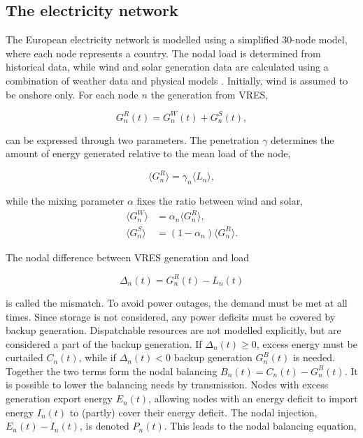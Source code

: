 \documentclass[a4paper, 5p, sort&compress]{elsarticle}%
\newcommand{\mean}[1]{\langle #1 \rangle}
\newcommand{\paren}[1]{\left(#1\right)}
\begin{document}
\subsection{The electricity network}

The European electricity network is modelled using a simplified
30-node model, where each node represents a country. The nodal load is
determined from historical data, while wind and solar generation data
are calculated using a combination of weather data and physical models
\cite{REA}. Initially, wind is assumed to be onshore only. For each
node $n$ the generation from VRES,

\begin{equation}
  G^{R}_{n}(t) = G_{n}^{W}(t) + G_{n}^{S}(t),
\end{equation}

can be expressed through two parameters. The penetration $\gamma$
determines the amount of energy generated relative to the mean load of
the node,

\begin{equation}
  \mean{G^{R}_{n}} = \gamma_{n} \mean{L_{n}} ,
\end{equation}

while the mixing parameter $\alpha$ fixes the ratio between wind and solar,
\begin{align}
  \mean{G^{W}_{n}} &=  \alpha_{n} \mean{G_{n}^{R}}  , \\
  \mean{G^{S}_{n}} &=  \paren{1- \alpha_{n}} \mean{G_{n}^{R}}  .
\end{align}

The nodal difference between VRES generation and load

\begin{equation}
  \Delta_{n}(t) = G^{R}_{n}(t) - L_{n}(t)
\end{equation}

is called the mismatch. To avoid power outages, the demand must be
met at all times. Since storage is not considered, any power
deficits must be covered by backup generation. Dispatchable
resources are not modelled explicitly, but are considered a part of
the backup generation. If $\Delta_{n}(t) \geq 0$, excess energy must be
curtailed $C_{n}(t)$, while if $\Delta_{n}(t) < 0$ backup generation
$G^{B}_{n}(t)$ is needed.
Together the two terms form the nodal balancing
$B_{n}(t) = C_{n}(t) - G^{B}_{n}(t)$.
%
It is possible to lower the balancing needs by transmission. Nodes
with excess generation export energy $E_{n}(t)$, allowing nodes with
an energy deficit to import energy $I_{n}(t)$ to (partly) cover their
energy deficit. The nodal injection, $E_{n}(t) - I_{n}(t)$, is denoted
$P_{n}(t)$. This leads to the nodal balancing equation,
\end{document}
